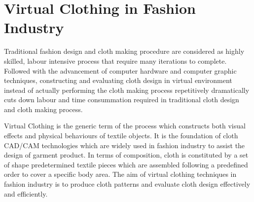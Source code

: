 %

\section{Virtual Clothing in Fashion Industry}
Traditional fashion design and cloth making procedure are considered as highly skilled, labour intensive process that require many iterations to complete. Followed with the advancement of computer hardware and computer graphic techniques, constructing and evaluating cloth design in virtual environment instead of actually performing the cloth making process repetitively dramatically cuts down labour and time consummation required in traditional cloth design and cloth making process. 

Virtual Clothing is the generic term of the process which constructs both visual effects and physical behaviours of textile objects. It is the foundation of cloth CAD/CAM technologies which are widely used in fashion industry to assist the design of garment product. In terms of composition, cloth is constituted by a set of shape predetermined textile pieces which are assembled following a predefined order to cover a specific body area. The aim of virtual clothing techniques in fashion industry is to produce cloth patterns and evaluate cloth design effectively and efficiently. 


